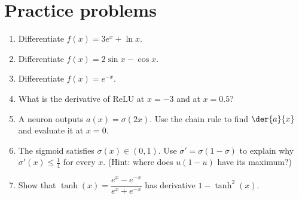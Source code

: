 \section*{Practice problems}
\begin{enumerate}[label=\textbf{\thechapter.\arabic*}]
  \item Differentiate $f(x)=3e^x+\ln x$.
  \item Differentiate $f(x)=2\sin x-\cos x$.
  \item Differentiate $f(x)=e^{-x}$.
  \item What is the derivative of $\mathrm{ReLU}$ at $x=-3$ and at $x=0.5$?
  \item A neuron outputs $a(x)=\sigma(2x)$. Use the chain rule to find $\der{a}{x}$ and evaluate it at $x=0$.
  \item The sigmoid satisfies $\sigma(x)\in(0,1)$. Use $\sigma'=\sigma(1-\sigma)$ to explain why $\sigma'(x)\le \tfrac14$ for every $x$. (Hint: where does $u(1-u)$ have its maximum?)
  \item[\textbf{\thechapter.7}$\star$] Show that $\tanh(x)=\dfrac{e^x-e^{-x}}{e^x+e^{-x}}$ has derivative $1-\tanh^2(x)$.
\end{enumerate}

